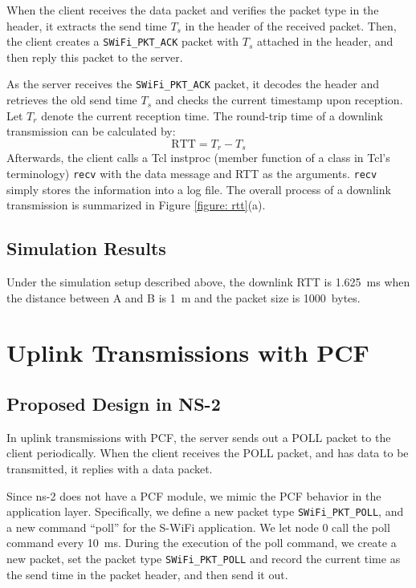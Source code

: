 \documentclass{article}
\begin{document}
When the client receives the data packet and verifies the packet type in the header, it extracts the send time $T_s$ in the header of the received packet. Then, the client creates a \lstinline|SWiFi_PKT_ACK| packet with $T_s$ attached in the header, and then reply this packet to the server.

As the server receives the \lstinline|SWiFi_PKT_ACK| packet, it decodes the header and retrieves the old send time $T_s$ and checks the current timestamp upon reception. Let $T_r$ denote the current reception time. The round-trip time of a downlink transmission can be calculated by:
\begin{equation}\label{equation: rtt}
\textrm{RTT}=T_r - T_s
\end{equation}
Afterwards, the client calls a Tcl instproc (member function of a class
in Tcl's terminology) \lstinline|recv| with the data message and RTT as the
arguments. \lstinline|recv| simply stores the information into a log file.
The overall process of a downlink transmission is summarized in Figure \ref{figure: rtt}(a). 

\subsection{Simulation Results}
Under the simulation setup described above, the downlink RTT is \SI{1.625}{ms} when the distance between A and B is \SI{1}{m} and the packet size is \SI{1000}{bytes}. 
\section{Uplink Transmissions with PCF}
\label{section: uplink}
\subsection{Proposed Design in NS-2}
In uplink transmissions with PCF, the server sends out a POLL packet to
the client periodically. When the client receives the POLL packet, and has data
to be transmitted, it replies with a data packet.

Since ns-2 does not have a PCF module, we mimic the PCF behavior in the
application layer. Specifically, we define a new packet type
\lstinline|SWiFi_PKT_POLL|, and a new command ``poll'' for the S-WiFi
application. We let node 0 call the poll command every \SI{10}{ms}.
During the execution of the poll command, we create a new packet, set the packet
type \lstinline|SWiFi_PKT_POLL| and record the current time as the send time in
the packet header, and then send it out.
\end{document}
